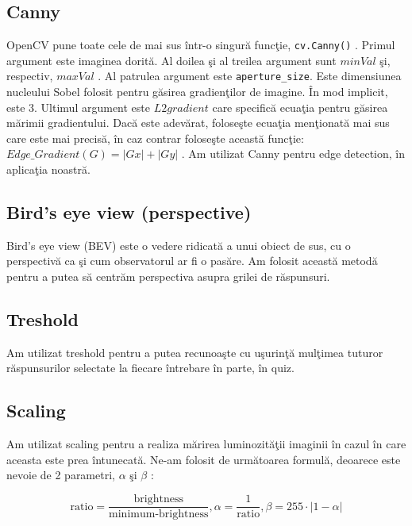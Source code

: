 \documentclass{report}
\begin{document}
\subsection{Canny}

OpenCV pune toate cele de mai sus într-o singur\u a func\c tie, \texttt{cv.Canny()} \cite{DocsCV}. Primul argument este imaginea dorit\u a. Al doilea \c si al treilea argument sunt $minVal$ \c si, respectiv, $maxVal$ \cite{Bradski2017-wp}. Al patrulea argument este \texttt{aperture\_size}. Este dimensiunea nucleului Sobel folosit pentru g\u asirea gradien\c tilor de imagine. În mod implicit, este 3. Ultimul argument este $L2gradient$ care specific\u a ecua\c tia pentru g\u asirea m\u arimii gradientului. Dac\u a este adev\u arat, folose\c ste ecua\c tia men\c tionat\u a mai sus care este mai precis\u a, în caz contrar folose\c ste aceast\u a func\c tie: $Edge\_Gradient(G)=|Gx|+|Gy|$ \cite{Minichino2015-do}.  Am utilizat Canny pentru edge detection, în aplica\c tia noastr\u a.

\subsection{Bird's eye view (perspective)}

Bird's eye view (BEV) \cite{Bradski2017-wp} este o vedere ridicat\u a a unui obiect de sus, cu o perspectiv\u a ca \c si cum observatorul ar fi o pas\u are. Am folosit aceast\u a metod\u a pentru a putea s\u a centr\u am perspectiva asupra grilei de r\u aspunsuri.


\subsection{Treshold}

Am utilizat treshold \cite{Minichino2015-do} pentru a putea recunoa\c ste cu u\c surin\c t\u a mul\c timea tuturor r\u aspunsurilor selectate la fiecare întrebare în parte, în quiz.

\subsection{Scaling}

Am utilizat scaling pentru a realiza m\u arirea luminozit\u a\c tii imaginii în cazul în care aceasta este prea întunecat\u a.
Ne-am folosit de urm\u atoarea formul\u a, deoarece este nevoie de 2 parametri, $\alpha$ \c si $\beta$ \cite{Minichino2015-do} \cite{Bradski2017-wp}:

$$\text{ratio}=\frac{\text{brightness}}{\text{minimum-brightness}}, \alpha=\frac{1}{\text{ratio}}, \beta=255\cdot |1-\alpha|$$
\end{document}
